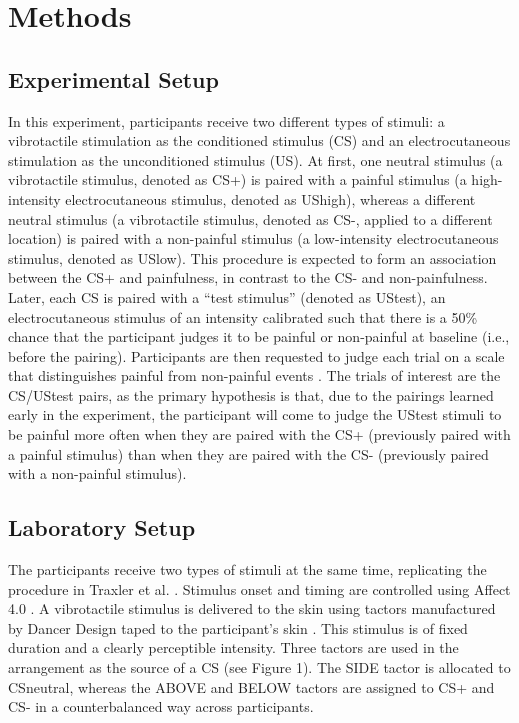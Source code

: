 \documentclass{article}
\begin{document}
\section{Methods}

\subsection{Experimental Setup}

In this experiment, participants receive two different types of stimuli: a vibrotactile stimulation as the conditioned stimulus (CS) and an electrocutaneous stimulation as the unconditioned stimulus (US). At first, one neutral stimulus (a vibrotactile stimulus, denoted as CS+) is paired with a painful stimulus (a high-intensity electrocutaneous stimulus, denoted as UShigh), whereas a different neutral stimulus (a vibrotactile stimulus, denoted as CS-, applied to a different location) is paired with a non-painful stimulus (a low-intensity electrocutaneous stimulus, denoted as USlow). This procedure is expected to form an association between the CS+ and painfulness, in contrast to the CS- and non-painfulness. Later, each CS is paired with a “test stimulus” (denoted as UStest), an electrocutaneous stimulus of an intensity calibrated such that there is a 50\% chance that the participant judges it to be painful or non-painful at baseline (i.e., before the pairing). Participants are then requested to judge each trial on a scale that distinguishes painful from non-painful events \autocite{bib53}. The trials of interest are the CS/UStest pairs, as the primary hypothesis is that, due to the pairings learned early in the experiment, the participant will come to judge the UStest stimuli to be painful more often when they are paired with the CS+ (previously paired with a painful stimulus) than when they are paired with the CS- (previously paired with a non-painful stimulus).

\subsection{Laboratory Setup}

The participants receive two types of stimuli at the same time, replicating the procedure in Traxler et al. \autocite{bib54}. Stimulus onset and timing are controlled using Affect 4.0 \autocite{bib55}. A vibrotactile stimulus is delivered to the skin using tactors manufactured by Dancer Design taped to the participant's skin \autocite{bib56}. This stimulus is of fixed duration and a clearly perceptible intensity. Three tactors are used in the arrangement as the source of a CS (see Figure 1). The SIDE tactor is allocated to CSneutral, whereas the ABOVE and BELOW tactors are assigned to CS+ and CS- in a counterbalanced way across participants.
\end{document}

